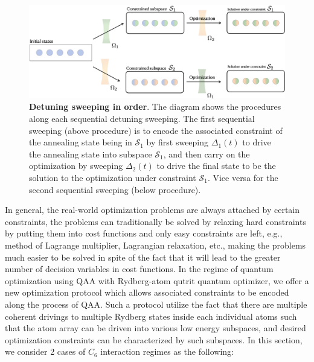 \documentclass[%
 reprint,
nofootinbib,
 amsmath,amssymb,
 aps,
floatfix,
]{revtex4-2}
\begin{document}
\begin{figure}[b!]
    \centering
    \includegraphics[width=13cm]{picture/opti_procedure.png}
    \caption{\textbf{Detuning sweeping in order}.  The diagram shows the procedures along each sequential detuning sweeping. The first sequential sweeping (above procedure) is to encode the associated constraint of the annealing state being in $\mathcal{S}_1$ by first sweeping $\Delta_1(t)$ to drive the annealing state into subspace $\mathcal{S}_1$, and then carry on the optimization by sweeping $\Delta_2(t)$ to drive the final state to be the solution to the optimization under constraint $\mathcal{S}_1$. Vice versa for the second sequential sweeping (below procedure).}
    \label{fig:opt_procedure}
\end{figure}
In general, the real-world optimization problems are always attached by certain constraints, the problems can traditionally be solved by relaxing hard constraints by putting them into cost functions and only easy constraints are left, e.g., method of Lagrange multiplier, Lagrangian relaxation, etc., making the problems much easier to be solved in spite of the fact that it will lead to the greater number of decision variables in cost functions. In the regime of quantum optimization using QAA with Rydberg-atom qutrit quantum optimizer, we offer a new optimization protocol which allows associated constraints to be encoded along the process of QAA. Such a protocol utilize the fact that there are multiple coherent drivings to multiple Rydberg states inside each individual atoms such that the atom array can be driven into various low energy subspaces, and desired optimization constraints can be characterized by such subspaces. In this section, we consider 2 cases of $C_6$ interaction regimes as the following:
\end{document}
